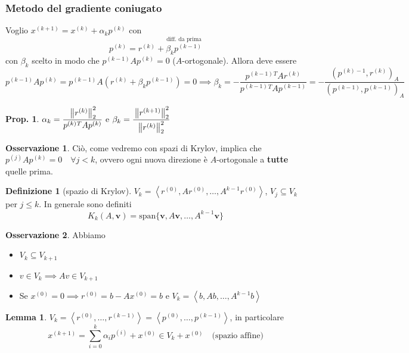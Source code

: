 \documentclass[a4paper,10pt]{article}
\theoremstyle{definition}
\newcommand{\bv}{\boldsymbol} %
\theoremstyle{indentdefinition}
\newtheorem{defn}{Definizione}[section]
\theoremstyle{indenttheorem}
\newtheorem{prop}{Prop.}
\newtheorem{lem}{Lemma}
\theoremstyle{myremark}
\newtheorem*{rem*}{Osservazione}
\theoremstyle{indentgeneral}
\theoremstyle{plain}
\theoremstyle{plain}
\newenvironment{myboxed} 
{\noindent\begin{lrbox}{\mybox}\begin{minipage}{\textwidth}}
{\end{minipage}\end{lrbox}\fbox{\usebox{\mybox}}}
\begin{document}
\subsubsection{Metodo del gradiente coniugato}

Voglio $x^{\left(k+1\right)}=x^{\left(k\right)}+\alpha_{k}p^{\left(k\right)}$ con 
$$p^{(k)}=r^{(k)}+\overset{\text{diff. da prima}}{\boxed{\beta_kp^{(k-1)}}}$$
con $\beta_k$ scelto in modo che $p^{(k-1)}Ap^{(k)}=0$ ($A$-ortogonale). Allora deve essere
$$p^{(k-1)}Ap^{(k)}=p^{(k-1)}A(r^{(k)}+\beta_kp^{(k-1)})=0\implies\beta_k=-\frac{p^{\left(k-1\right)}{}^{T}Ar^{\left(k\right)}}{p^{\left(k-1\right)}{}^{T}Ap^{\left(k-1\right)}}=\boxed{-\frac{(p^{(k)-1},r^{(k)})_A}{(p^{(k-1)},p^{(k-1)})_A}}$$

\begin{prop}
$\alpha_{k}=\cfrac{\left\Vert r^{\left(k\right)}\right\Vert _{2}^{2}}{p^{\left(k\right)}{}^{T}Ap^{\left(k\right)}}$
e $\beta_{k}=\cfrac{\left\Vert r^{\left(k+1\right)}\right\Vert _{2}^{2}}{\left\Vert r^{\left(k\right)}\right\Vert _{2}^{2}}$
\end{prop}

\begin{rem*}
    Ciò, come vedremo con spazi di Krylov, implica che $p^{(j)}Ap^{(k)}=0 \quad \forall j<k$, ovvero ogni nuova direzione è $A$-ortogonale a \textbf{tutte} quelle prima.
\end{rem*}

\begin{defn}[spazio di Krylov]
$V_{k}=\left\langle r^{(0)},Ar^{(0)},\ldots,A^{k-1}r^{(0)}\right\rangle$,
$V_{j}\subseteq V_{k}$ per $j\leq k$. In generale sono definiti
$$K_k(A,\bv{v})=\text{span}\{\bv{v},A\bv{v},\ldots,A^{k-1}\bv{v}\}$$
\end{defn}
\begin{rem*}
    Abbiamo
    \begin{itemize}
        \item $V_k\subseteq V_{k+1}$
        \item $v\in V_k\implies Av\in V_{k+1}$
        \item Se $x^{(0)}=0\implies r^{(0)}=b-Ax^{(0)}=b$ e $V_k=\left\langle b,Ab,\ldots,A^{k-1}b\right\rangle$
    \end{itemize}
\end{rem*}

\begin{myboxed}
\begin{lem}
$V_{k}=\left\langle r^{\left(0\right)},\ldots,r^{\left(k-1\right)}\right\rangle=\left\langle p^{\left(0\right)},\ldots,p^{\left(k-1\right)}\right\rangle$, in particolare $$x^{(k+1)}=\sum_{i=0}^k\alpha_ip^{(i)}+x^{(0)}\in V_k+x^{(0)} \quad \text{(spazio affine)}$$
\end{lem}
\end{myboxed}
\end{document}
